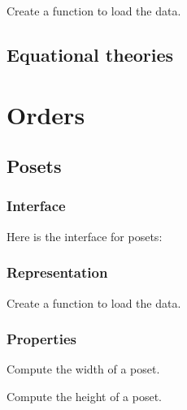 \begin{exercise}[Representation]
Create a function to load the data.


%

\end{exercise}


\section{Equational theories}



\chapter{Orders}


\section{Posets}

\subsection*{Interface}

Here is the interface for posets:

%

\subsection*{Representation}


\begin{exercise}[Representation]
Create a function to load the data.


%

\end{exercise}

\subsection{Properties}


\begin{exercise}
Compute the width of a poset.
\end{exercise}

\begin{exercise}
Compute the height of a poset.
\end{exercise}

